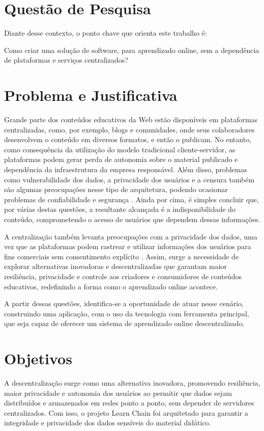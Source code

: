 \section{Questão de Pesquisa}
Diante desse contexto, o ponto chave que orienta este trabalho é:

Como criar uma solução de software, para aprendizado online, sem a dependência de plataformas e serviços centralizados?

\section{Problema e Justificativa}

Grande parte dos conteúdos educativos da Web estão disponíveis em plataformas centralizadas, como, por exemplo, blogs e comunidades, onde seus colaboradores desenvolvem o conteúdo em diversos formatos, e então o publicam. No entanto, como consequência da utilização do modelo tradicional cliente-servidor, as plataformas podem gerar perda de autonomia sobre o material publicado e dependência da infraestrutura da empresa responsável. Além disso, problemas como vulnerabilidade dos dados, a privacidade dos usuários e a censura também são algumas preocupações nesse tipo de arquitetura, podendo ocasionar problemas de confiabilidade e segurança \cite{wanner2024}. Ainda por cima, é simples concluir que, por várias destas questões, a resultante alcançada é a indisponibilidade do conteúdo, comprometendo o acesso de usuários que dependem dessas informações. 

A centralização também levanta preocupações com a privacidade dos dados, uma vez que as plataformas podem rastrear e utilizar informações dos usuários para fins comerciais sem consentimento explícito \cite{beiro2020}. Assim, surge a necessidade de explorar alternativas inovadoras e descentralizadas que garantam maior resiliência, privacidade e controle aos criadores e consumidores de conteúdos educativos, redefinindo a forma como o aprendizado online acontece.

A partir dessas questões, identifica-se a oportunidade de atuar nesse cenário, construindo uma aplicação, com o uso da tecnologia com ferramenta principal, que seja capaz de oferecer um sistema de aprendizado online descentralizado.

\section{Objetivos}

A descentralização surge como uma alternativa inovadora, promovendo resiliência, maior privacidade e autonomia dos usuários ao permitir que dados sejam distribuídos e armazenados em redes ponto a ponto, sem depender de servidores centralizados. Com isso, o projeto Learn Chain foi arquitetado para garantir a integridade e privacidade dos dados sensíveis do material didático. 

